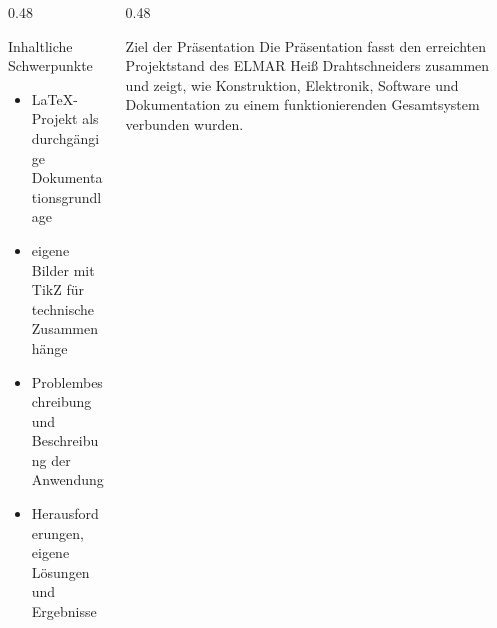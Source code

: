 %
%


{
  \begin{columns}[T]
    \begin{column}{0.48\textwidth}
      \begin{block}{Inhaltliche Schwerpunkte}
        \begin{itemize}
          \item LaTeX-Projekt als durchgängige Dokumentationsgrundlage
          \item eigene Bilder mit TikZ für technische Zusammenhänge
          \item Problembeschreibung und Beschreibung der Anwendung
          \item Herausforderungen, eigene Lösungen und Ergebnisse
        \end{itemize}
      \end{block}
    \end{column}
    \begin{column}{0.48\textwidth}
      \begin{block}{Ziel der Präsentation}
        Die Präsentation fasst den erreichten Projektstand des ELMAR Heiß Drahtschneiders zusammen und zeigt, wie Konstruktion, Elektronik, Software und Dokumentation zu einem funktionierenden Gesamtsystem verbunden wurden.
      \end{block}
    \end{column}
  \end{columns}
}

